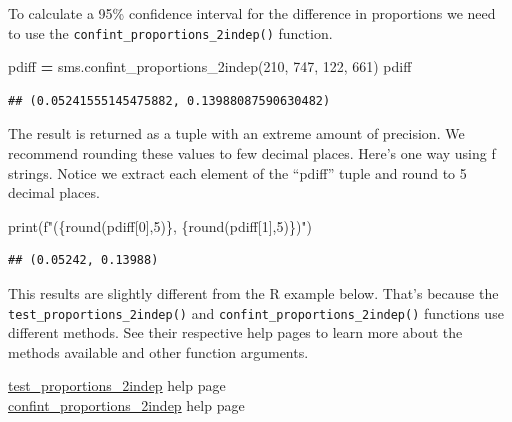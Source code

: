 \documentclass[
]{book}
\newenvironment{Shaded}{\begin{snugshade}}{\end{snugshade}}
\newcommand{\BuiltInTok}[1]{#1}
\newcommand{\DecValTok}[1]{\textcolor[rgb]{0.00,0.00,0.81}{#1}}
\newcommand{\NormalTok}[1]{#1}
\newcommand{\OperatorTok}[1]{\textcolor[rgb]{0.81,0.36,0.00}{\textbf{#1}}}
\newcommand{\SpecialCharTok}[1]{\textcolor[rgb]{0.00,0.00,0.00}{#1}}
\newcommand{\SpecialStringTok}[1]{\textcolor[rgb]{0.31,0.60,0.02}{#1}}
\begin{document}
To calculate a 95\% confidence interval for the difference in proportions we need to use the \texttt{confint\_proportions\_2indep()} function.

\begin{Shaded}
\begin{Highlighting}[]
\NormalTok{pdiff }\OperatorTok{=}\NormalTok{ sms.confint\_proportions\_2indep(}\DecValTok{210}\NormalTok{, }\DecValTok{747}\NormalTok{, }\DecValTok{122}\NormalTok{, }\DecValTok{661}\NormalTok{)}
\NormalTok{pdiff}
\end{Highlighting}
\end{Shaded}

\begin{verbatim}
## (0.05241555145475882, 0.13988087590630482)
\end{verbatim}

The result is returned as a tuple with an extreme amount of precision. We recommend rounding these values to few decimal places. Here's one way using f strings. Notice we extract each element of the ``pdiff'' tuple and round to 5 decimal places.

\begin{Shaded}
\begin{Highlighting}[]
\BuiltInTok{print}\NormalTok{(}\SpecialStringTok{f"(}\SpecialCharTok{\{}\BuiltInTok{round}\NormalTok{(pdiff[}\DecValTok{0}\NormalTok{],}\DecValTok{5}\NormalTok{)}\SpecialCharTok{\}}\SpecialStringTok{, }\SpecialCharTok{\{}\BuiltInTok{round}\NormalTok{(pdiff[}\DecValTok{1}\NormalTok{],}\DecValTok{5}\NormalTok{)}\SpecialCharTok{\}}\SpecialStringTok{)"}\NormalTok{)}
\end{Highlighting}
\end{Shaded}

\begin{verbatim}
## (0.05242, 0.13988)
\end{verbatim}

This results are slightly different from the R example below. That's because the \texttt{test\_proportions\_2indep()} and \texttt{confint\_proportions\_2indep()} functions use different methods. See their respective help pages to learn more about the methods available and other function arguments.

\href{https://www.statsmodels.org/dev/generated/statsmodels.stats.proportion.test_proportions_2indep.html\#statsmodels.stats.proportion.test_proportions_2indep}{test\_proportions\_2indep} help page\\
\href{https://www.statsmodels.org/dev/generated/statsmodels.stats.proportion.confint_proportions_2indep.html\#statsmodels.stats.proportion.confint_proportions_2indep}{confint\_proportions\_2indep} help page
\end{document}
